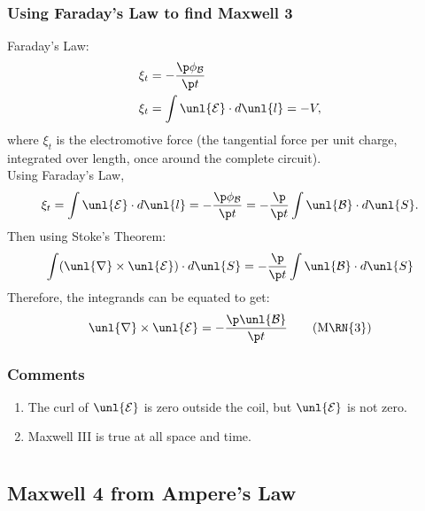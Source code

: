 \documentclass[a4paper, 11pt, normalem]{report}
\renewcommand\E{\mathcal{E}}
\newcommand\uE{\unl{\E}}
\renewcommand\B{\mathcal{B}}
\newcommand\uB{\unl{\B}}
\renewcommand\del{\unl{\nabla}}
\begin{document}
\subsection{Using Faraday's Law to find Maxwell 3}
Faraday's Law:
\begin{align}
    \xi_t &= -\frac{\p \phi_\B}{\p t} \\
    \xi_t &= \int \uE \cdot d\unl{l} = -V,
\end{align}
where $\xi_t$ is the electromotive force (the tangential force per unit charge, integrated over length, once around the complete circuit). \\
Using Faraday's Law,
\begin{equation}
    \xi_t = \int \uE\cdot d\unl{l} = -\frac{\p \phi_\B}{\p t} = -\frac{\p}{\p t}\int \uB \cdot d\unl{S}.
\end{equation}
Then using Stoke's Theorem:
\begin{equation}
    \int (\del \times \uE) \cdot d\unl{S} = -\frac{\p}{\p t}\int \uB \cdot d\unl{S}
\end{equation}
Therefore, the integrands can be equated to get:
\begin{equation}
    \del \times \uE = -\frac{\p \uB}{\p t} \tag{M\RN{3}}
\end{equation}

\subsection{Comments}
\begin{enumerate}
    \item The curl of $\uE$ is zero outside the coil, but $\uE$ is not zero.
    \item Maxwell \RN{3} is true at all space and time.
\end{enumerate}

\chapter{}
\section{Maxwell 4 from Ampere's Law}
\end{document}
